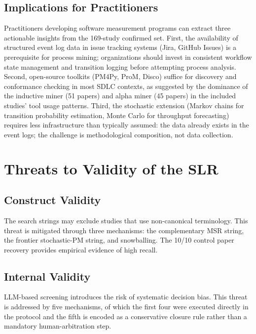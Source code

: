 \subsection{Implications for Practitioners}
\label{sec:slr-practitioners}

Practitioners developing software measurement programs can extract three
actionable insights from the 169-study confirmed set. First, the availability
of structured event log data in issue tracking systems (Jira, GitHub Issues)
is a prerequisite for process mining; organizations should invest in
consistent workflow state management and transition logging before attempting
process analysis. Second, open-source toolkits (PM4Py, ProM, Disco) suffice
for discovery and conformance checking in most SDLC contexts, as suggested by
the dominance of the inductive miner (51 papers) and alpha miner (45 papers)
in the included studies' tool usage patterns. Third, the stochastic extension
(Markov chains for transition probability estimation, Monte Carlo for
throughput forecasting) requires less infrastructure than typically assumed:
the data already exists in the event logs; the challenge is methodological
composition, not data collection.


\section{Threats to Validity of the SLR}
\label{sec:slr-threats}

\subsection{Construct Validity}

The search strings may exclude studies that use non-canonical terminology.
This threat is mitigated through three mechanisms: the complementary MSR
string, the frontier stochastic-PM string, and snowballing. The 10/10 control
paper recovery provides empirical evidence of high recall.

\subsection{Internal Validity}

LLM-based screening introduces the risk of systematic decision bias. This
threat is addressed by five mechanisms, of which the first four were
executed directly in the protocol and the fifth is encoded as a conservative
closure rule rather than a mandatory human-arbitration step.

